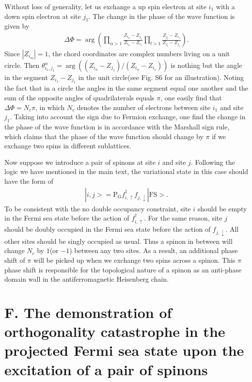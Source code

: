 \documentclass[12pt]{article}
\begin{document}
Without loss of generality, let us exchange a up spin electron at site $i_{1}$ with a down spin electron at site $j_{1}$. The change in the phase of the wave function is given by
\begin{eqnarray}
    \Delta\Phi=\arg(\prod_{\alpha>1}\frac{Z_{i_{\alpha}}-Z_{j_{1}}}{Z_{i_{\alpha}}-Z_{i_{1}}}\prod_{l>1}
    \frac{Z_{j_{l}}-Z_{i_{1}}}{Z_{j_{l}}-Z_{j_{1}}}).\nonumber
\end{eqnarray}
Since $|Z_{i_{m}}|=1$, the chord coordinates are complex numbers living on a unit circle.
Then $\theta^{\alpha}_{i_{1},j_{1}}=\arg((Z_{i_{\alpha}}-Z_{j_{1}})/(Z_{i_{\alpha}}-Z_{i_{1}}))$ is
nothing but the angle in the segment $Z_{i_{1}}-Z_{j_{1}}$ in the
unit circle(see Fig. S6 for an illustration). Noting the fact that in a circle the angles in the same
segment equal one another and the sum of the opposite angles of
quadrilaterals equals $\pi$, one easily find that
$\Delta\Phi=N_{c}\pi$, in which $N_{c}$ denotes the number of
electrons between site $i_{1}$ and site $j_{1}$. Taking into account
the sign due to Fermion exchange, one find the change in the phase of the wave function is in
accordance with the Marshall sign rule, which claims that the phase of the wave function should change by $\pi$ if we exchange two spins in different sublattices. 



Now suppose we introduce a pair of spinons at site $i$ and site $j$. Following the logic we have mentioned in the main text, the variational state in this case should have the form of
\begin{eqnarray}
|i,j>=\mathrm{P_{G}}f^{\dagger}_{i,\uparrow}f_{j,\downarrow}|\mathrm{FS}>\nonumber.
\end{eqnarray}
To be consistent with the no double occupancy constraint, site $i$ should be empty in the Fermi sea state before the action 
of $f^{\dagger}_{i,\uparrow}$. For the same reason, site $j$ should be doubly occupied in the Fermi sea state before the action 
of $f_{j,\downarrow}$. All other sites should be singly occupied as usual. Thus a spinon in between will change $N_{c}$ by $1$(or $-1$) between any two sites. As a result, an additional phase shift of $\pi$ will be picked up when we exchange two spins across a spinon. This $\pi$ phase shift is responsible for the topological nature of a spinon as an anti-phase domain wall in the antiferromagnetic Heisenberg chain.



\section*{F. The demonstration of orthogonality catastrophe in the projected Fermi sea state upon the excitation of a pair of spinons}
\end{document}
